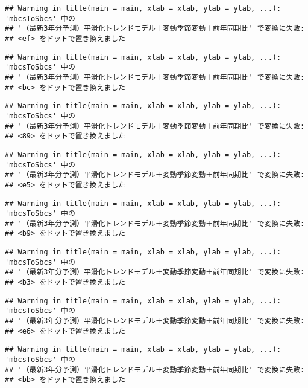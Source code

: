 \documentclass[]{article}
\begin{document}
\begin{verbatim}
## Warning in title(main = main, xlab = xlab, ylab = ylab, ...): 'mbcsToSbcs' 中の
## '（最新3年分予測）平滑化トレンドモデル＋変動季節変動＋前年同期比' で変換に失敗:
## <ef> をドットで置き換えました
\end{verbatim}

\begin{verbatim}
## Warning in title(main = main, xlab = xlab, ylab = ylab, ...): 'mbcsToSbcs' 中の
## '（最新3年分予測）平滑化トレンドモデル＋変動季節変動＋前年同期比' で変換に失敗:
## <bc> をドットで置き換えました
\end{verbatim}

\begin{verbatim}
## Warning in title(main = main, xlab = xlab, ylab = ylab, ...): 'mbcsToSbcs' 中の
## '（最新3年分予測）平滑化トレンドモデル＋変動季節変動＋前年同期比' で変換に失敗:
## <89> をドットで置き換えました
\end{verbatim}

\begin{verbatim}
## Warning in title(main = main, xlab = xlab, ylab = ylab, ...): 'mbcsToSbcs' 中の
## '（最新3年分予測）平滑化トレンドモデル＋変動季節変動＋前年同期比' で変換に失敗:
## <e5> をドットで置き換えました
\end{verbatim}

\begin{verbatim}
## Warning in title(main = main, xlab = xlab, ylab = ylab, ...): 'mbcsToSbcs' 中の
## '（最新3年分予測）平滑化トレンドモデル＋変動季節変動＋前年同期比' で変換に失敗:
## <b9> をドットで置き換えました
\end{verbatim}

\begin{verbatim}
## Warning in title(main = main, xlab = xlab, ylab = ylab, ...): 'mbcsToSbcs' 中の
## '（最新3年分予測）平滑化トレンドモデル＋変動季節変動＋前年同期比' で変換に失敗:
## <b3> をドットで置き換えました
\end{verbatim}

\begin{verbatim}
## Warning in title(main = main, xlab = xlab, ylab = ylab, ...): 'mbcsToSbcs' 中の
## '（最新3年分予測）平滑化トレンドモデル＋変動季節変動＋前年同期比' で変換に失敗:
## <e6> をドットで置き換えました
\end{verbatim}

\begin{verbatim}
## Warning in title(main = main, xlab = xlab, ylab = ylab, ...): 'mbcsToSbcs' 中の
## '（最新3年分予測）平滑化トレンドモデル＋変動季節変動＋前年同期比' で変換に失敗:
## <bb> をドットで置き換えました
\end{verbatim}
\end{document}
